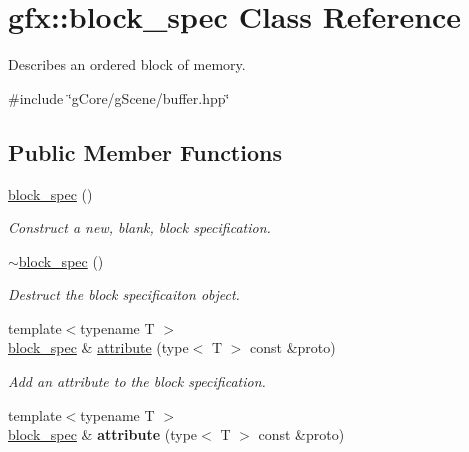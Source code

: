 \hypertarget{classgfx_1_1block__spec}{\section{gfx\-:\-:block\-\_\-spec Class Reference}
\label{classgfx_1_1block__spec}
}


Describes an ordered block of memory.  




{\ttfamily \#include \char`\"{}g\-Core/g\-Scene/buffer.\-hpp\char`\"{}}

\subsection*{Public Member Functions}
\begin{DoxyCompactItemize}
\item 
\hypertarget{classgfx_1_1block__spec_ab0a36e50fd3ff5c900d565f32073e888}{\hyperlink{classgfx_1_1block__spec_ab0a36e50fd3ff5c900d565f32073e888}{block\-\_\-spec} ()}\label{classgfx_1_1block__spec_ab0a36e50fd3ff5c900d565f32073e888}

\begin{DoxyCompactList}\small\item\em Construct a new, blank, block specification. \end{DoxyCompactList}\item 
\hypertarget{classgfx_1_1block__spec_a573e9b5548ef77f7e2e3a13e266a954d}{\hyperlink{classgfx_1_1block__spec_a573e9b5548ef77f7e2e3a13e266a954d}{$\sim$block\-\_\-spec} ()}\label{classgfx_1_1block__spec_a573e9b5548ef77f7e2e3a13e266a954d}

\begin{DoxyCompactList}\small\item\em Destruct the block specificaiton object. \end{DoxyCompactList}\item 
{\footnotesize template$<$typename T $>$ }\\\hyperlink{classgfx_1_1block__spec}{block\-\_\-spec} \& \hyperlink{classgfx_1_1block__spec_af1330f4cafde86f25c21619f1b472cc3}{attribute} (type$<$ T $>$ const \&proto)
\begin{DoxyCompactList}\small\item\em Add an attribute to the block specification. \end{DoxyCompactList}\item 
\hypertarget{classgfx_1_1block__spec_a57e30d9a1ea24fb2e0bbee663fce839c}{{\footnotesize template$<$typename T $>$ }\\\hyperlink{classgfx_1_1block__spec}{block\-\_\-spec} \& {\bfseries attribute} (type$<$ T $>$ const \&proto)}\label{classgfx_1_1block__spec_a57e30d9a1ea24fb2e0bbee663fce839c}

\end{DoxyCompactItemize}
